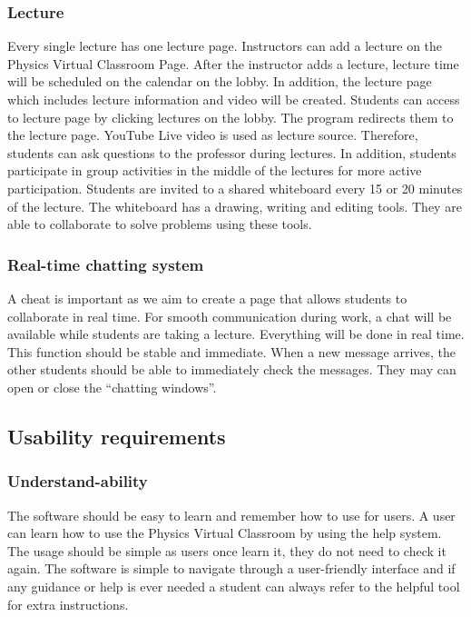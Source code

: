 \documentclass[10pt]{article}
\begin{document}
            \subsubsection{Lecture}
                Every single lecture has one lecture page. Instructors can add a lecture on the Physics Virtual Classroom Page. After the instructor adds a lecture, lecture time will be scheduled on the calendar on the lobby. In addition, the lecture page which includes lecture information and video will be created. Students can access to lecture page by clicking lectures on the lobby. The program redirects them to the lecture page. YouTube Live video is used as lecture source. Therefore, students can ask questions to the professor during lectures. In addition, students participate in group activities in the middle of the lectures for more active participation. Students are invited to a shared whiteboard every 15 or 20 minutes of the lecture.  The whiteboard has a drawing, writing and editing tools. They are able to collaborate to solve problems using these tools.

            \subsubsection{Real-time chatting system}
                A cheat is important as we aim to create a page that allows students to collaborate in real time. For smooth communication during work, a chat will be available while students are taking a lecture. Everything will be done in real time. This function should be stable and immediate. When a new message arrives, the other students should be able to immediately check the messages. They may can open or close the “chatting windows”. 

    \subsection{Usability requirements}
        \subsubsection{Understand-ability}
            The software should be easy to learn and remember how to use for users. A user can learn how to use the Physics Virtual Classroom by using the help system. The usage should be simple as users once learn it, they do not need to check it again. The software is simple to navigate through a user-friendly interface and if any guidance or help is ever needed a student can always refer to the helpful tool for extra instructions.
        
\end{document}
